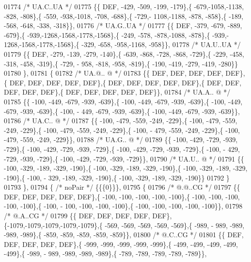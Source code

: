 \begin{DoxyCode}
01774 \textcolor{comment}{/* UA.C..UA */}
01775 \{\{  DEF, -429, -509, -199, -179\},\{ -679,-1058,-1138, -828, -808\},\{ -559, -938,-1018, -708, -688\},\{ -729,-
      1108,-1188, -878, -858\},\{ -189, -568, -648, -338, -318\}\},
01776 \textcolor{comment}{/* UA.G..UA */}
01777 \{\{  DEF, -379, -679, -889, -679\},\{ -939,-1268,-1568,-1778,-1568\},\{ -249, -578, -878,-1088, -878\},\{ -939,-
      1268,-1568,-1778,-1568\},\{ -329, -658, -958,-1168, -958\}\},
01778 \textcolor{comment}{/* UA.U..UA */}
01779 \{\{  DEF, -279, -139, -279, -140\},\{ -639, -868, -728, -868, -729\},\{ -229, -458, -318, -458, -319\},\{ -729, -
      958, -818, -958, -819\},\{ -190, -419, -279, -419, -280\}\}
01780 \},
01781 \{
01782 \textcolor{comment}{/* UA.@.. @ */}
01783 \{\{  DEF,  DEF,  DEF,  DEF,  DEF\},\{  DEF,  DEF,  DEF,  DEF,  DEF\},\{  DEF,  DEF,  DEF,  DEF,  DEF\},\{  DEF,  
      DEF,  DEF,  DEF,  DEF\},\{  DEF,  DEF,  DEF,  DEF,  DEF\}\},
01784 \textcolor{comment}{/* UA.A.. @ */}
01785 \{\{ -100, -449, -679, -939, -639\},\{ -100, -449, -679, -939, -639\},\{ -100, -449, -679, -939, -639\},\{ -100, -
      449, -679, -939, -639\},\{ -100, -449, -679, -939, -639\}\},
01786 \textcolor{comment}{/* UA.C.. @ */}
01787 \{\{ -100, -479, -559, -249, -229\},\{ -100, -479, -559, -249, -229\},\{ -100, -479, -559, -249, -229\},\{ -100, -
      479, -559, -249, -229\},\{ -100, -479, -559, -249, -229\}\},
01788 \textcolor{comment}{/* UA.G.. @ */}
01789 \{\{ -100, -429, -729, -939, -729\},\{ -100, -429, -729, -939, -729\},\{ -100, -429, -729, -939, -729\},\{ -100, -
      429, -729, -939, -729\},\{ -100, -429, -729, -939, -729\}\},
01790 \textcolor{comment}{/* UA.U.. @ */}
01791 \{\{ -100, -329, -189, -329, -190\},\{ -100, -329, -189, -329, -190\},\{ -100, -329, -189, -329, -190\},\{ -100, -
      329, -189, -329, -190\},\{ -100, -329, -189, -329, -190\}\}
01792 \}
01793 \},
01794 \{ \textcolor{comment}{/* noPair */} \{\{\{0\}\}\},
01795 \{
01796 \textcolor{comment}{/*  @.@..CG */}
01797 \{\{  DEF,  DEF,  DEF,  DEF,  DEF\},\{ -100, -100, -100, -100, -100\},\{ -100, -100, -100, -100, -100\},\{ -100, -
      100, -100, -100, -100\},\{ -100, -100, -100, -100, -100\}\},
01798 \textcolor{comment}{/*  @.A..CG */}
01799 \{\{  DEF,  DEF,  DEF,  DEF,  DEF\},\{-1079,-1079,-1079,-1079,-1079\},\{ -569, -569, -569, -569, -569\},\{ -989, -
      989, -989, -989, -989\},\{ -859, -859, -859, -859, -859\}\},
01800 \textcolor{comment}{/*  @.C..CG */}
01801 \{\{  DEF,  DEF,  DEF,  DEF,  DEF\},\{ -999, -999, -999, -999, -999\},\{ -499, -499, -499, -499, -499\},\{ -989, -
      989, -989, -989, -989\},\{ -789, -789, -789, -789, -789\}\},

\end{DoxyCode}
